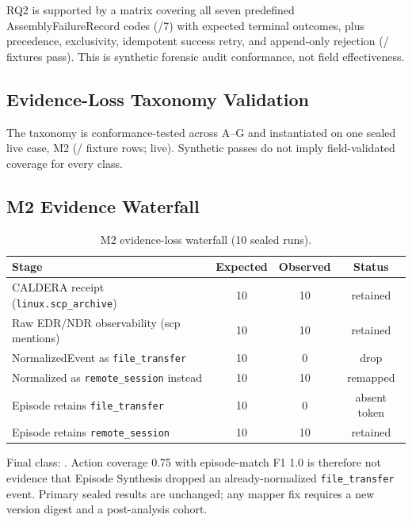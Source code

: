 

RQ2 is supported by a matrix covering all seven predefined AssemblyFailureRecord codes
(\AuditFailCodes{}/7) with expected terminal outcomes, plus precedence, exclusivity,
idempotent success retry, and append-only rejection
(\AuditPass{}/\AuditTotal{} fixtures pass). This is synthetic forensic audit conformance, not
field effectiveness.

\subsection{Evidence-Loss Taxonomy Validation}
\label{sec:taxonomy}



The taxonomy is conformance-tested across A--G and instantiated on one sealed live case, M2
(\TaxPass{}/\TaxTotal{} fixture rows; \TaxLive{} live). Synthetic passes do not imply
field-validated coverage for every class.

\subsection{M2 Evidence Waterfall}
\label{sec:m2-analysis}

\begin{table}[!t]
\caption{M2 evidence-loss waterfall (10 sealed runs).}
\label{tab:m2-waterfall}
\centering
\scriptsize
\setlength{\tabcolsep}{3pt}
\begin{tabular}{@{}lccc@{}}
\toprule
\textbf{Stage} & \textbf{Expected} & \textbf{Observed} & \textbf{Status} \\
\midrule
CALDERA receipt (\texttt{linux.scp\_archive}) & 10 & 10 & retained \\
Raw EDR/NDR observability (scp mentions) & 10 & 10 & retained \\
NormalizedEvent as \texttt{file\_transfer} & 10 & 0 & drop \\
Normalized as \texttt{remote\_session} instead & 10 & 10 & remapped \\
Episode retains \texttt{file\_transfer} & 10 & 0 & absent token \\
Episode retains \texttt{remote\_session} & 10 & 10 & retained \\
\bottomrule
\end{tabular}
\end{table}

Final class: \MTwoClass{}. Action coverage 0.75 with episode-match F1 1.0 is therefore not evidence that
Episode Synthesis dropped an already-normalized \texttt{file\_transfer} event. Primary sealed
results are unchanged; any mapper fix requires a new version digest and a post-analysis cohort.

